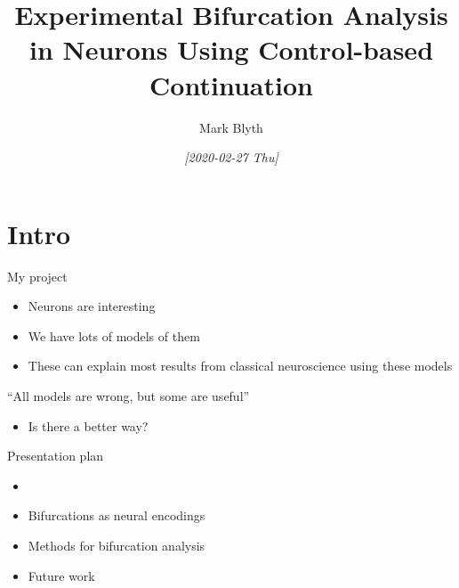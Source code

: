 \documentclass[presentation]{beamer}
\author{Mark Blyth}
\date{\textit{[2020-02-27 Thu]}}
\title{Experimental Bifurcation Analysis in Neurons Using Control-based Continuation}
\begin{document}
\maketitle

\section{Intro}
\label{sec:orgde500e5}
\begin{frame}[label={sec:orge706abb}]{My project}
\begin{itemize}
\item Neurons are interesting
\item We have lots of models of them
\item These can explain most results from classical neuroscience using these models
\end{itemize}

\vfill
\begin{exampleblock}{}
  {\large ``All models are wrong, but some are useful''}
  \vskip5mm
  \hspace*{}
\end{exampleblock}
\vfill

\begin{itemize}
\item Is there a better way?
\end{itemize}
\end{frame}

\begin{frame}[label={sec:org8dd21e5}]{Presentation plan}
\begin{itemize}
\item \color{bristolred}{A brief introduction to neurons}
\item \color{black} Bifurcations as neural encodings
\item Methods for bifurcation analysis
\item Future work
\end{itemize}
\end{frame}
\end{document}
